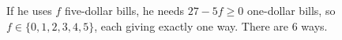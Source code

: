 If he uses $f$ five-dollar bills, he needs $27-5f\ge0$ one-dollar bills, so $f\in\{0,1,2,3,4,5\}$, each giving exactly one way. There are $\boxed{6}$ ways.
